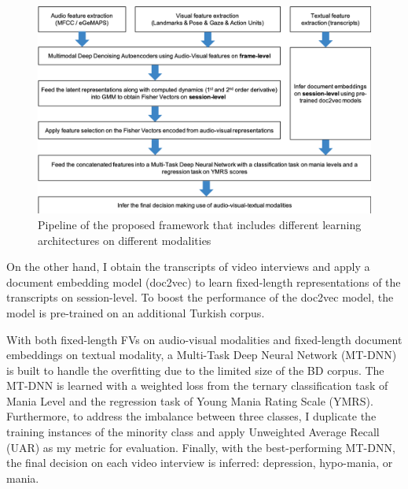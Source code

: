 \begin{figure}[ht]
    \centering
    \includegraphics[width=13.5cm]{images/design/general_pipeline.png}
    \caption{Pipeline of the proposed framework that includes different learning architectures on different modalities}
    \label{fig:pipeline}
\end{figure}

On the other hand, I obtain the transcripts of video interviews and apply a document embedding model (doc2vec) to learn fixed-length representations of the transcripts on session-level. To boost the performance of the doc2vec model, the model is pre-trained on an additional Turkish corpus. 

With both fixed-length FVs on audio-visual modalities and fixed-length document embeddings on textual modality, a Multi-Task Deep Neural Network (MT-DNN) is built to handle the overfitting due to the limited size of the BD corpus. The MT-DNN is learned with a weighted loss from the ternary classification task of Mania Level and the regression task of Young Mania Rating Scale (YMRS). Furthermore, to address the imbalance between three classes, I duplicate the training instances of the minority class and apply Unweighted Average Recall (UAR) as my metric for evaluation. Finally, with the best-performing MT-DNN, the final decision on each video interview is inferred: depression, hypo-mania, or mania.











